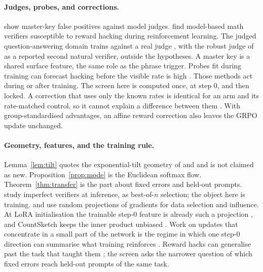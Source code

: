 \paragraph{Judges, probes, and corrections.}
\citet{zhao2025token} show master-key false positives against model judges.
\citet{huang2025hacking} find model-based math verifiers susceptible to reward hacking during reinforcement learning.
The judged question-answering domain trains against a real judge \citep{ma2025reasoner}, with the robust judge of \citet{zhao2025token} as a reported second natural verifier, outside the hypotheses.
A master key is a shared surface feature, the same role as the phrase trigger.
Probes fit during training can forecast hacking before the visible rate is high \citep{beigi2026probes,wang2026grift,bergen2026means,karmakar2026judge}.
Those methods act during or after training.
The screen here is computed once, at step 0, and then locked.
A correction that uses only the known rates is identical for an arm and its rate-matched control, so it cannot explain a difference between them \citep{cai2025correct,mansouri2025correct}.
With group-standardised advantages, an affine reward correction also leaves the GRPO update unchanged.

\paragraph{Geometry, features, and the training rule.}
Lemma~\ref{lem:tilt} quotes the exponential-tilt geometry of \citet{mroueh2025tilt} and \citet{dorner2025tilt} and is not claimed as new.
Proposition~\ref{prop:mode} is the Euclidean softmax flow.
Theorem~\ref{thm:transfer} is the part about fixed errors and held-out prompts.
\citet{stroebl2024limits} study imperfect verifiers at inference, as best-of-$n$ selection; the object here is training.
\citet{xia2024less} and \citet{park2023trak} use random projections of gradients for data selection and influence.
At LoRA initialisation the trainable step-0 feature is already such a projection \citep{hu2021lora}, and CountSketch keeps the inner product unbiased \citep{charikar2002frequent}.
Work on updates that concentrate in a small part of the network is the regime in which one step-0 direction can summarise what training reinforces \citep{subnetworks2025rl,razor2025rl}.
Reward hacks can generalise past the task that taught them \citep{macdiarmid2025hacks,taylor2025harmless,daniels2026preference}; the screen asks the narrower question of which fixed errors reach held-out prompts of the same task.
